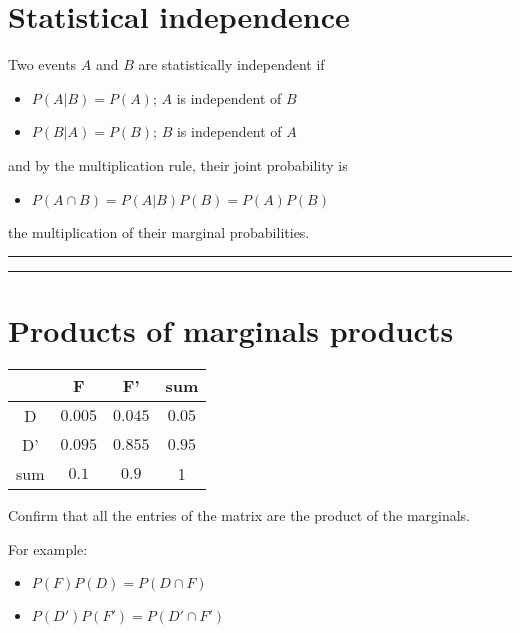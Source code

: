 \documentclass[
]{book}
\providecommand{\tightlist}{%
  \setlength{\itemsep}{0pt}\setlength{\parskip}{0pt}}
\begin{document}
\hypertarget{statistical-independence-3}{%
\section{Statistical independence}\label{statistical-independence-3}}

Two events \(A\) and \(B\) are statistically independent if

\begin{itemize}
\tightlist
\item
  \(P(A|B)=P(A)\); \(A\) is independent of \(B\)
\item
  \(P(B|A)=P(B)\); \(B\) is independent of \(A\)
\end{itemize}

and by the multiplication rule, their joint probability is

\begin{itemize}
\tightlist
\item
  \(P(A\cap B)=P(A|B)P(B)=P(A)P(B)\)
\end{itemize}

the multiplication of their marginal probabilities.

\begin{center}\rule{0.5\linewidth}{0.5pt}\end{center}

\begin{center}\rule{0.5\linewidth}{0.5pt}\end{center}

\hypertarget{products-of-marginals-products}{%
\section{Products of marginals products}\label{products-of-marginals-products}}

\begin{longtable}[]{@{}cccc@{}}
\toprule
& F & F' & sum \\
\midrule
\endhead
D & \(0.005\) & \(0.045\) & \(0.05\) \\
D' & \(0.095\) & \(0.855\) & \(0.95\) \\
sum & \(0.1\) & \(0.9\) & 1 \\
\bottomrule
\end{longtable}

Confirm that all the entries of the matrix are the product of the marginals.

For example:

\begin{itemize}
\tightlist
\item
  \(P(F)P(D)= P(D \cap F)\)
\item
  \(P(D')P(F')=P(D' \cap F')\)
\end{itemize}
\end{document}
